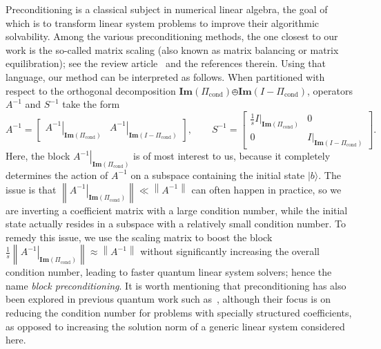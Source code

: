 \documentclass[letterpaper,onecolumn,11pt,accepted=2026-02-14]{quantumarticle}
\newcommand{\norm}[1]{\left\lVert#1\right\rVert}
\theoremstyle{remark}
\theoremstyle{plain}
\newcommand{\ket}[1]{|#1\rangle}
\begin{document}
Preconditioning is a classical subject in numerical linear algebra, the goal of which is to transform linear system problems to improve their algorithmic solvability. Among the various preconditioning methods, the one closest to our work is the so-called matrix scaling (also known as matrix balancing or matrix equilibration); see the review article~\cite{Idel16} and the references therein. Using that language, our method can be interpreted as follows. When partitioned with respect to the orthogonal decomposition $\mathbf{Im}\left(\Pi_{\text{cond}}\right)\obot\mathbf{Im}\left(I-\Pi_{\text{cond}}\right)$, operators $A^{-1}$ and $S^{-1}$ take the form
\begin{equation}
    A^{-1}=
    \begin{bmatrix}
    \left.A^{-1}\right|_{\mathbf{Im}\left(\Pi_{\text{cond}}\right)} & \left.A^{-1}\right|_{\mathbf{Im}\left(I-\Pi_{\text{cond}}\right)}
    \end{bmatrix},\qquad
    S^{-1}=
    \begin{bmatrix}
        \frac{1}{s}\left.I\right|_{\mathbf{Im}\left(\Pi_{\text{cond}}\right)} & 0\\
        0 & \left.I\right|_{\mathbf{Im}\left(I-\Pi_{\text{cond}}\right)}
    \end{bmatrix}.
\end{equation}
Here, the block $\left.A^{-1}\right|_{\mathbf{Im}\left(\Pi_{\text{cond}}\right)}$ is of most interest to us, because it completely determines the action of $A^{-1}$ on a subspace containing the initial state $\ket{b}$. The issue is that $\norm{\left.A^{-1}\right|_{\mathbf{Im}\left(\Pi_{\text{cond}}\right)}}\ll\norm{A^{-1}}$ can often happen in practice, so we are inverting a coefficient matrix with a large condition number, while the initial state actually resides in a subspace with a relatively small condition number. To remedy this issue, we use the scaling matrix to boost the block $\frac{1}{s}\norm{\left.A^{-1}\right|_{\mathbf{Im}\left(\Pi_{\text{cond}}\right)}}\approx\norm{A^{-1}}$ without significantly increasing the overall condition number, leading to faster quantum linear system solvers; hence the name \emph{block preconditioning}. It is worth mentioning that preconditioning has also been explored in previous quantum work such as~\cite{2021Yupreconditioned,Preconditioned13,Circulant18}, although their focus is on reducing the condition number for problems with specially structured coefficients, as opposed to increasing the solution norm of a generic linear system considered here. 
\end{document}
